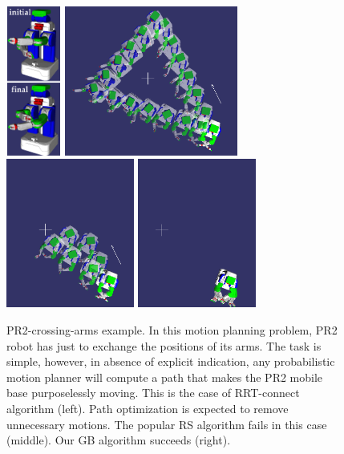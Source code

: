 \documentclass{tADR2e}
\begin{document}
\begin{figure}[b]
	\centering
	\includegraphics[height=4.9cm,width=1.8cm]{pr2_initial_final_vertical.png}
	\includegraphics[width=5.7cm]{p0_pr2_alone_merged3.png}
	\includegraphics[height=4.9cm]{p1RS_pr2_alone_merged3.png}
	\includegraphics[height=4.9cm]{p1GB_pr2_alone_merged3.png}\\
	\caption{PR2-crossing-arms example. In this motion planning problem, PR2 robot 
	has just to 
exchange the positions of its arms. The task is simple, however, in absence of 
explicit indication, any probabilistic motion planner will compute a path that 
makes the PR2 mobile base purposelessly moving. This is the case of RRT-connect 
algorithm (left). Path optimization is expected to remove unnecessary motions. 
The popular RS algorithm fails in this case (middle). Our GB algorithm 
succeeds (right).}
	\label{pr2_final}
\end{figure}
\end{document}
